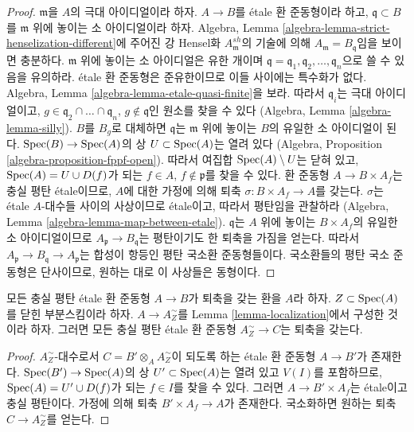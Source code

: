 \begin{proof}
$\mathfrak m$을 $A$의 극대 아이디얼이라 하자. $A \to B$를 \'etale
환 준동형이라 하고, $\mathfrak q \subset B$를 $\mathfrak m$ 위에 놓이는
소 아이디얼이라 하자. Algebra, Lemma
\ref{algebra-lemma-strict-henselization-different}에 주어진 강 Hensel화
$A_\mathfrak m^{sh}$의 기술에 의해
$A_\mathfrak m = B_\mathfrak q$임을 보이면 충분하다.
$\mathfrak m$ 위에 놓이는 소 아이디얼은 유한 개이며
$\mathfrak q = \mathfrak q_1, \mathfrak q_2, \ldots, \mathfrak q_n$으로
쓸 수 있음을 유의하라. \'etale 환 준동형은 준유한이므로 이들 사이에는
특수화가 없다. Algebra, Lemma
\ref{algebra-lemma-etale-quasi-finite}을 보라. 따라서
$\mathfrak q_i$는 극대 아이디얼이고,
$g \in \mathfrak q_2 \cap \ldots \cap \mathfrak q_n$,
$g \not \in \mathfrak q$인 원소를 찾을 수 있다
(Algebra, Lemma \ref{algebra-lemma-silly}).
$B$를 $B_g$로 대체하면 $\mathfrak q$는 $\mathfrak m$ 위에 놓이는
$B$의 유일한 소 아이디얼이 된다.
$\mathop{\mathrm{Spec}}(B) \to \mathop{\mathrm{Spec}}(A)$의 상 $U \subset \mathop{\mathrm{Spec}}(A)$는 열려 있다
(Algebra, Proposition \ref{algebra-proposition-fppf-open}).
따라서 여집합 $\mathop{\mathrm{Spec}}(A) \setminus U$는 닫혀 있고,
$\mathop{\mathrm{Spec}}(A) = U \cup D(f)$가 되는 $f \in A$, $f \not \in \mathfrak p$를
찾을 수 있다. 환 준동형 $A \to B \times A_f$는 충실 평탄 \'etale이므로,
$A$에 대한 가정에 의해 퇴축 $\sigma : B \times A_f \to A$를 갖는다.
$\sigma$는 \'etale $A$-대수들 사이의 사상이므로 \'etale이고,
따라서 평탄임을 관찰하라
(Algebra, Lemma \ref{algebra-lemma-map-between-etale}).
$\mathfrak q$는 $A$ 위에 놓이는 $B \times A_f$의 유일한 소 아이디얼이므로
$A_\mathfrak p \to B_\mathfrak q$는 평탄이기도 한 퇴축을 가짐을 얻는다.
따라서
$A_\mathfrak p \to B_\mathfrak q \to A_\mathfrak p$는
합성이 항등인 평탄 국소환 준동형들이다. 국소환들의 평탄 국소 준동형은
단사이므로, 원하는 대로 이 사상들은 동형이다.
\end{proof}

\begin{lemma}
\label{lemma-have-sections-localize}
모든 충실 평탄 \'etale 환 준동형 $A \to B$가 퇴축을 갖는 환을
$A$라 하자. $Z \subset \mathop{\mathrm{Spec}}(A)$를 닫힌 부분스킴이라 하자.
$A \to A_Z^\sim$를 Lemma \ref{lemma-localization}에서 구성한 것이라 하자.
그러면 모든 충실 평탄 \'etale 환 준동형 $A_Z^\sim \to C$는 퇴축을 갖는다.
\end{lemma}

\begin{proof}
$A_Z^\sim$-대수로서 $C = B' \otimes_A A_Z^\sim$이 되도록 하는
\'etale 환 준동형 $A \to B'$가 존재한다.
$\mathop{\mathrm{Spec}}(B') \to \mathop{\mathrm{Spec}}(A)$의 상 $U' \subset \mathop{\mathrm{Spec}}(A)$는 열려 있고
$V(I)$를 포함하므로, $\mathop{\mathrm{Spec}}(A) = U' \cup D(f)$가 되는
$f \in I$를 찾을 수 있다. 그러면 $A \to B' \times A_f$는
\'etale이고 충실 평탄이다. 가정에 의해 퇴축 $B' \times A_f \to A$가
존재한다. 국소화하면 원하는 퇴축 $C \to A_Z^\sim$를 얻는다.
\end{proof}

